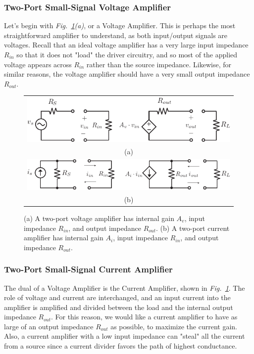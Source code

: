 \subsubsection{Two-Port Small-Signal Voltage Amplifier}
Let's begin with \emph{Fig.~\ref{fig:vi_amp}(a)}, or a Voltage Amplifier.  This is perhaps the most straightforward amplifier to understand, as both input/output signals are voltages.  Recall that an ideal voltage amplifier has a very large input impedance $R_{in}$ so that it does not "load" the driver circuitry, and so most of the applied voltage appears across $R_{in}$ rather than the source impedance.  Likewise, for similar reasons, the voltage amplifier should have a very small output impedance $R_{out}$.
\begin{figure}[tb]
\centering
\begin{tabular}{c}
\includegraphics[width=.7\columnwidth]{vamp_label}\\
(a)\\
\includegraphics[width=.7\columnwidth]{iamp}\\
(b)\\
\end{tabular}
\caption{(a) A two-port voltage amplifier has internal gain $A_v$, input impedance $R_{in}$, and output impedance $R_{out}$.  (b) A two-port current amplifier has internal gain $A_i$, input impedance $R_{in}$, and output impedance $R_{out}$.}
\label{fig:vi_amp}
\end{figure}
\subsubsection{Two-Port Small-Signal Current Amplifier}
The dual of a Voltage Amplifier is the Current Amplifier, shown in \emph{Fig.~\ref{fig:vi_amp}}.  The role of voltage and current are interchanged, and an input current into the amplifier is amplified and divided between the load and the internal output impedance $R_{out}$.  For this reason, we would like a current amplifier to have as large of an output impedance $R_{out}$ as possible, to maximize the current gain.  Also, a current amplifier with a low input impedance can "steal" all the current from a source since a current divider favors the path of highest conductance.

